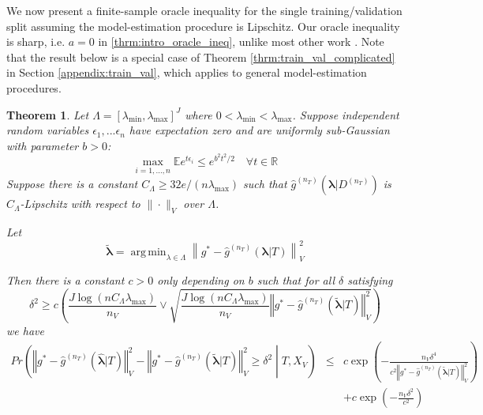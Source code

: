 \documentclass[12pt]{article}
\newtheorem{theorem}{Theorem}
\DeclareMathOperator*{\argmin}{arg\,min}
\begin{document}
We now present a finite-sample oracle inequality for the single training/validation split assuming the model-estimation procedure is Lipschitz. Our oracle inequality is sharp, i.e. $a=0$ in \eqref{thrm:intro_oracle_ineq}, unlike most other work \citep{gyorfi2006distribution, lecue2012oracle, van2003unified}. Note that the result below is a special case of Theorem \ref{thrm:train_val_complicated} in Section \ref{appendix:train_val}, which applies to general model-estimation procedures.
\begin{theorem}
\label{thrm:train_val}
Let $\Lambda=[\lambda_{\min},\lambda_{\max}]^{J}$ where $0 < \lambda_{\min} < \lambda_{\max}$. Suppose independent random variables $\epsilon_1, ... \epsilon_n$ have expectation zero and are uniformly sub-Gaussian with parameter $b > 0$:
$$
\max_{i=1,...,n} \mathbb{E} e^{t \epsilon_i} \le e^{b^2t^2/2} \quad \forall t \in \mathbb{R}
$$
Suppose there is a constant $C_\Lambda \ge 32e/(n \lambda_{\max})$ such that $\hat g^{(n_T)}(\boldsymbol{\lambda} |D^{(n_T)})$ is $C_\Lambda$-Lipschitz with respect to $\| \cdot \|_V$ over $\Lambda$.

Let 
\begin{equation}
\tilde{\boldsymbol \lambda} = \argmin_{\lambda \in \Lambda} \left \| g^*-\hat{g}^{(n_T)}( \boldsymbol{\lambda} | T) \right \|_{V}^{2}
\label{eq:tilde_lambda_def}
\end{equation}

Then there is a constant $c>0$ only depending on $b$ such that for all $\delta$ satisfying
\begin{equation}
\delta^{2}
\ge
c \left ( 
\frac{J\log (n C_\Lambda\lambda_{\max})}{n_{V}}
\vee 
\sqrt{\frac{J \log (n C_\Lambda \lambda_{\max})}{n_{V}}\left\Vert g^* - \hat{g}^{(n_T)}( \tilde{\boldsymbol{\lambda}} | T)\right\Vert_{V}^2}
\right )
\label{thrm:train_val_delta}
\end{equation}
we have
\begin{eqnarray*}
	Pr\left(
	\left\Vert g^* - \hat{g}^{(n_T)}( \hat{\boldsymbol{\lambda}} | T) \right\Vert _{V}^2 -
	\left\Vert g^* - \hat{g}^{(n_T)}( \tilde{\boldsymbol{\lambda}} | T) \right\Vert _{V}^2
	\ge\delta^2
	\middle | 
	T, X_V
	\right )
	&\le& c\exp\left(-\frac{n_{V}\delta^{4}}{
		c^{2}
		\left\Vert g^* - \hat{g}^{(n_T)}( \tilde{\boldsymbol{\lambda}} | T) \right\Vert _{V}^2
	}\right) \\
	&& +c\exp\left(-\frac{n_{V}\delta^{2}}{c^{2}}\right) \\
\end{eqnarray*}

\end{theorem}
\end{document}
